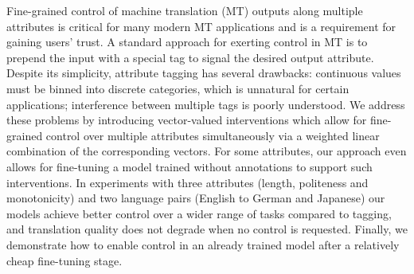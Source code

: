 Fine-grained control of machine translation (MT) outputs along multiple attributes is critical for many modern MT applications and is a requirement for gaining users' trust. A standard approach for exerting control in MT is to prepend the input with a special tag to signal the desired output attribute. Despite its simplicity, attribute tagging has several drawbacks: continuous values must be binned into discrete categories, which is unnatural for certain applications; interference between multiple tags is poorly understood. We address these problems by introducing vector-valued interventions which allow for fine-grained control over multiple attributes simultaneously via a weighted linear combination of the corresponding vectors. For some attributes, our approach even allows for fine-tuning a model trained without annotations to support such interventions. In experiments with three attributes (length, politeness and monotonicity) and two language pairs (English to German and Japanese) our models achieve better control over a wider range of tasks compared to tagging, and translation quality does not degrade when no control is requested. Finally, we demonstrate how to enable control in an already trained model after a relatively cheap fine-tuning stage.
